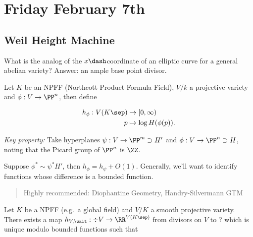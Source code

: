 \hypertarget{friday-february-7th}{%
\section{Friday February 7th}\label{friday-february-7th}}

\hypertarget{weil-height-machine}{%
\subsection{Weil Height Machine}\label{weil-height-machine}}

What is the analog of the \(x\dash\)coordinate of an elliptic curve for
a general abelian variety? Answer: an ample base point divisor.

Let \(K\) be an NPFF (Northcott Product Formula Field), \(V/k\) a
projective variety and \(\phi: V \to \PP^n\), then define

\begin{align*}
h_\phi: V(K\sep) &\to [0, \infty) \\
p &\mapsto \log H(\phi(p))
.\end{align*}

\emph{Key property:} Take hyperplanes \(\psi: V \to \PP^m \supset H'\)
and \(\phi: V\to \PP^n \supset H\), noting that the Picard group of
\(\PP^n\) is \(\ZZ\).

Suppose \(\phi^* \sim \psi^* H'\), then \(h_\phi = h_\psi + O(1)\).
Generally, we'll want to identify functions whose difference is a
bounded function.

\begin{quote}
Highly recommended: Diophantine Geometry, Handry-Silvermann GTM
\end{quote}

\begin{description}
\tightlist
\item[Theorem (Weil Height)]
Let \(K\) be a NPFF (e.g.~a global field) and \(V/K\) a smooth
projective variety. There exists a map
\(h_{V, \wait}: \div V \to \RR^{V(K\sep)}\) from divisors on \(V\) to ?
which is unique modulo bounded functions such that
\end{description}

